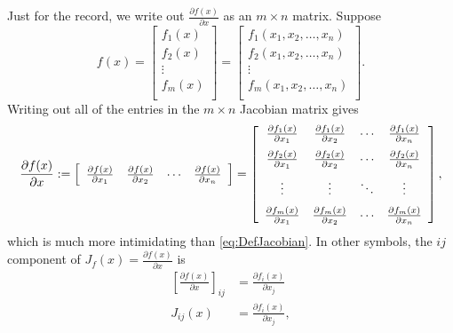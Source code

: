  \vspace*{.2cm}

Just for the record, we write out $\frac{\partial f(x)}{\partial x}$ as an $m \times n$ matrix. Suppose
$$f(x) = \left[
\begin{array}{c}
f_1(x) \\
f_2(x)\\
\vdots \\
f_m(x)\\
\end{array}
\right] =  \left[ \begin{array}{c}
f_1(x_1, x_2, \dots, x_n) \\
f_2(x_1, x_2, \dots, x_n)\\
\vdots \\
f_m(x_1, x_2, \dots, x_n)\\
\end{array}
\right].$$
Writing out all of the entries in the $m \times n$ Jacobian matrix gives 
\begin{equation}
    \label{eq:VectorFunctions03}
    \frac{\partial f(x)}{\partial x} := \left[\begin{array}{cccc}
      \frac{\partial f(x)}{\partial x_1} & \frac{\partial f(x)}{\partial x_2} & \cdots & \frac{\partial f(x)}{\partial x_n}
    \end{array} \right] =\left[\begin{array}{cccc}
      \frac{\partial f_1(x)}{\partial x_1} & \frac{\partial f_1(x)}{\partial x_2} & \cdots & \frac{\partial f_1(x)}{\partial x_n} \medskip \\
      \frac{\partial f_2(x)}{\partial x_1} & \frac{\partial f_2(x)}{\partial x_2} & \cdots & \frac{\partial f_2(x)}{\partial x_n} \medskip \\
      \vdots & \vdots & \ddots & \vdots \medskip \\
      \frac{\partial f_m(x)}{\partial x_1} & \frac{\partial f_m(x)}{\partial x_2} & \cdots & \frac{\partial f_m(x)}{\partial x_n} 
    \end{array} \right],
\end{equation}
which is much more intimidating than \eqref{eq:DefJacobian}. In other symbols, the $ij$ component of $J_f(x) = \frac{\partial f(x)}{\partial x}$ is
\begin{equation}
\label{eq:JacobianEachEntry}
\begin{aligned}
    \left[ \frac{\partial f(x)}{\partial x}  \right]_{ij} &= \frac{\partial f_i(x)}{\partial x_j} \\
    J_{ij}(x) & = \frac{\partial f_i(x)}{\partial x_j},
\end{aligned}
\end{equation}
\\

